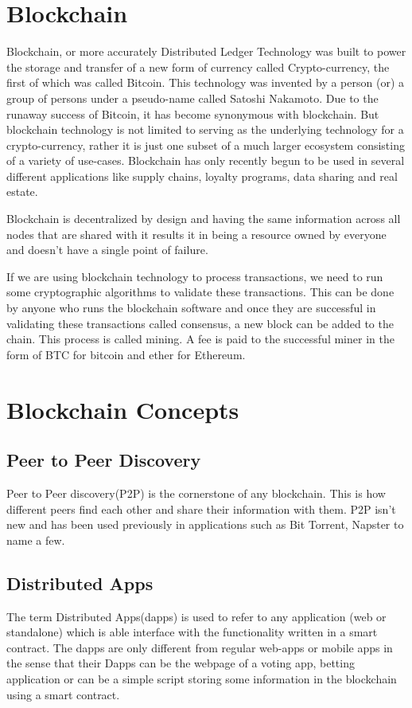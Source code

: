 \documentclass[11pt,openright]{report}
\begin{document}
\section{Blockchain}
Blockchain, or more accurately Distributed Ledger Technology was built to power the storage and transfer of a new form of currency called Crypto-currency, the first of which was called Bitcoin. This technology was invented by a person (or) a group of persons under a pseudo-name called Satoshi Nakamoto. Due to the runaway success of Bitcoin, it has become synonymous with blockchain. But blockchain technology is not limited to serving as the underlying technology for a crypto-currency, rather it is just one subset of a much larger ecosystem consisting of a variety of use-cases. Blockchain has only recently begun to be used in several different applications like supply chains, loyalty programs, data sharing and real estate.

Blockchain is decentralized by design and having the same information across all nodes that are shared with it results it in being a resource owned by everyone and doesn’t have a single point of failure. 

If we are using blockchain technology to process transactions, we need to run some cryptographic algorithms to validate these transactions. This can be done by anyone who runs the blockchain software and once they are successful in validating these transactions called consensus, a new block can be added to the chain. This process is called mining. A fee is paid to the successful miner in the form of BTC for bitcoin and ether for Ethereum.

\section{Blockchain Concepts}
\subsection{Peer to Peer Discovery}
Peer to Peer discovery(P2P) is the cornerstone of any blockchain. This is how different peers find each other and share their information with them. P2P isn't new and has been used previously in applications such as Bit Torrent, Napster to name a few.

\subsection{Distributed Apps}
The term Distributed Apps(dapps) is used to refer to any application (web or standalone) which is able interface with the functionality written in a smart contract. The dapps are only different from regular web-apps or mobile apps in the sense that their Dapps can be the webpage of a voting app, betting application or can be a simple script storing some information in the blockchain using a smart contract.
\end{document}
